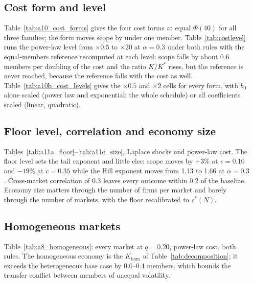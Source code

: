 


\subsection{Cost form and level}\label{app:cost}

Table~\ref{tab:a10_cost_forms} gives the four cost forms at equal $\Phi(40)$ for all three families; the form moves scope by under one member. Table~\ref{tab:costlevel} runs the power-law level from $\times 0.5$ to $\times 20$ at $\alpha = 0.3$ under both rules with the equal-members reference recomputed at each level: scope falls by about 0.6 members per doubling of the cost and the ratio $K/K^*$ rises, but the reference is never reached, because the reference falls with the cost as well. Table~\ref{tab:a10b_cost_levels} gives the $\times 0.5$ and $\times 2$ cells for every form, with $b_0$ alone scaled (power law and exponential: the whole schedule) or all coefficients scaled (linear, quadratic).





\subsection{Floor level, correlation and economy size}\label{app:environment}

Tables~\ref{tab:a11a_floor}--\ref{tab:a11c_size}, Laplace shocks and power-law cost. The floor level sets the tail exponent and little else: scope moves by $+3\%$ at $c = 0.10$ and $-19\%$ at $c = 0.35$ while the Hill exponent moves from 1.13 to 1.66 at $\alpha = 0.3$. Cross-market correlation of 0.3 leaves every outcome within 0.2 of the baseline. Economy size matters through the number of firms per market and barely through the number of markets, with the floor recalibrated to $c^*(N)$.





\subsection{Homogeneous markets}\label{app:homogeneous}

Table~\ref{tab:a8_homogeneous}: every market at $q = 0.20$, power-law cost, both rules. The homogeneous economy is the $K_{\text{hom}}$ of Table~\ref{tab:decomposition}; it exceeds the heterogeneous base case by 0.0--0.4 members, which bounds the transfer conflict between members of unequal volatility.


